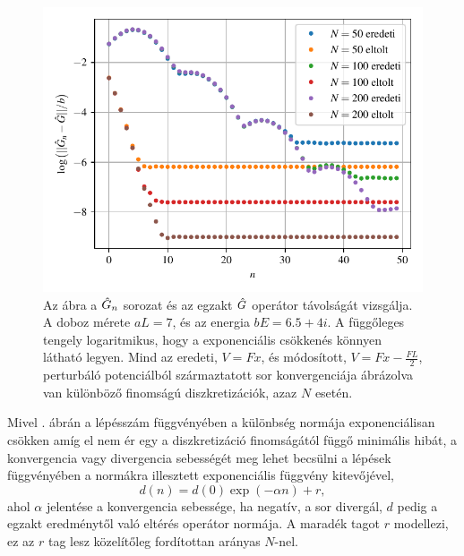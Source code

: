 \begin{figure}[H]
	\centering
	\includegraphics[scale=1]{./figs/convergencerate.pdf}
	\caption[A Green-függvény perturbációs sorának konvergencia sebessége]{Az ábra a $\hat{G}_n$ sorozat és az egzakt $\hat{G}$ operátor távolságát vizsgálja. A doboz mérete $aL=7$, és az energia $bE=6.5+4i$. A függőleges tengely logaritmikus, hogy a exponenciális csökkenés könnyen látható legyen. Mind az eredeti, $V=Fx$, és módosított, $V=Fx-\frac{FL}{2}$, perturbáló potenciálból származtatott sor konvergenciája ábrázolva van különböző finomságú diszkretizációk, azaz $N$ esetén.}
	\label{perturbation:covergencerate}
\end{figure}
Mivel . ábrán a lépésszám függvényében a különbség normája exponenciálisan csökken amíg el nem ér egy a diszkretizáció finomságától függő minimális hibát, a konvergencia vagy divergencia sebességét meg lehet becsülni a lépések függvényében a normákra illesztett exponenciális függvény kitevőjével,
\begin{equation}
	d(n) = d(0)\exp(-\alpha n)+r,
	\label{perturbation:fit}
\end{equation}
ahol $\alpha$ jelentése a konvergencia sebessége, ha negatív, a sor divergál, $d$ pedig a egzakt eredménytől való eltérés operátor normája. A maradék tagot $r$ modellezi, ez az $r$ tag lesz közelítőleg fordítottan arányas $N$-nel. 

